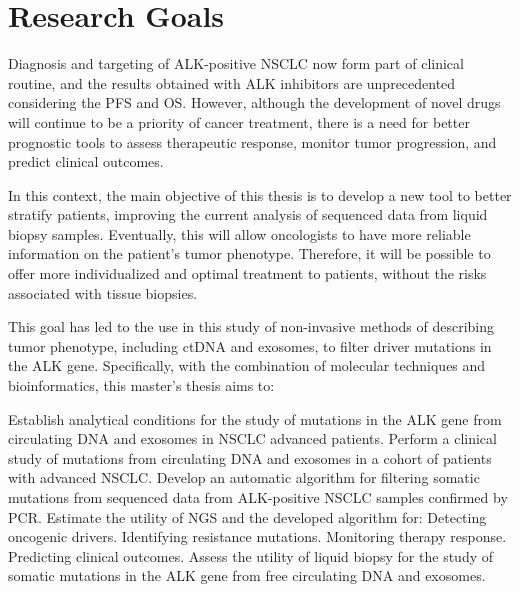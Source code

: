 \chapter{Research Goals}

Diagnosis and targeting of ALK-positive NSCLC now form part of clinical routine, and the results obtained with ALK inhibitors are unprecedented considering the PFS and OS. However, although the development of novel drugs will continue to be a priority of cancer treatment, there is a need for better prognostic tools to assess therapeutic response, monitor tumor progression, and predict clinical outcomes.

In this context, the main objective of this thesis is to develop a new tool to better stratify patients, improving the current analysis of sequenced data from liquid biopsy samples. Eventually, this will allow oncologists to have more reliable information on the patient's tumor phenotype. Therefore, it will be possible to offer more individualized and optimal treatment to patients, without the risks associated with tissue biopsies.

This goal has led to the use in this study of non-invasive methods of describing tumor phenotype, including ctDNA and exosomes, to filter driver mutations in the ALK gene. Specifically, with the combination of molecular techniques and bioinformatics, this master's thesis aims to:
\begin{outline}
    \1 Establish analytical conditions for the study of mutations in the ALK gene from circulating DNA and exosomes in NSCLC advanced patients.
    \1 Perform a clinical study of mutations from circulating DNA and exosomes in a cohort of patients with advanced NSCLC.
    \1 Develop an automatic algorithm for filtering somatic mutations from sequenced data from ALK-positive NSCLC samples confirmed by PCR.
    \1 Estimate the utility of NGS and the developed algorithm for:
        \2 Detecting oncogenic drivers.
        \2 Identifying resistance mutations.
        \2 Monitoring therapy response.
        \2 Predicting clinical outcomes.
    \1 Assess the utility of liquid biopsy for the study of somatic mutations in the ALK gene from free circulating DNA and exosomes.
\end{outline}